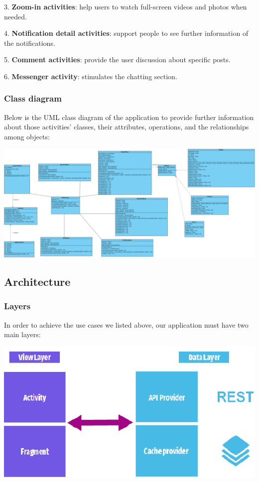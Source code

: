 \vspace{0.2cm}3.	\textbf{Zoom-in activities}: help users to watch full-screen videos and photos when needed.

\vspace{0.2cm}4.	\textbf{Notification detail activities}: support people to see further information of the notifications.

\vspace{0.2cm}5.	\textbf{Comment activities}: provide the user discussion about specific posts.

\vspace{0.2cm}6.	\textbf{Messenger activity}: stimulates the chatting section.

\subsubsection{Class diagram}
\hspace{0.5cm}Below is the UML class diagram of the application to provide further information about those activities’ classes, their attributes, operations, and the relationships among objects:

\vspace{1cm}
\includegraphics{Image/class_diagram.png}

\newpage
\subsection{Architecture}
\subsubsection{Layers}
\hspace{0.7cm}In order to achieve the use cases we listed above, our application must have two main layers:

\vspace{1cm}
\includegraphics{Image/ArcLayer_new.png}

